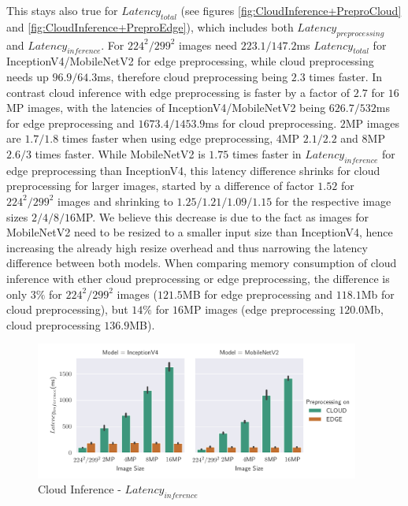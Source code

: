 This stays also true for $Latency_{total}$ (see figures \ref{fig:CloudInference+PreproCloud} and \ref{fig:CloudInference+PreproEdge}), which includes both $Latency_{preprocessing}$ and $Latency_{inference}$. 
For $224^2/299^2$ images need $223.1/147.2$ms $Latency_{total}$ for InceptionV4/MobileNetV2 for edge preprocessing, while cloud preprocessing needs up $96.9/64.3$ms, therefore cloud preprocessing being $2.3$ times faster.
In contrast cloud inference with edge preprocessing is faster by a factor of $2.7$ for $16$MP images, with the latencies of InceptionV4/MobileNetV2 being $626.7/532$ms for edge preprocessing and $1673.4/1453.9$ms for cloud preprocessing. $2$MP images are $1.7/1.8$ times faster when using edge preprocessing, $4$MP $2.1/2.2$ and $8$MP $2.6/3$ times faster.
While MobileNetV2 is $1.75$ times faster in $Latency_{inference}$ for edge preprocessing than InceptionV4, this latency difference shrinks for cloud preprocessing for larger images, started by a difference of factor $1.52$ for $224^2/299^2$ images and shrinking to $1.25/1.21/1.09/1.15$ for the respective image sizes $2/4/8/16$MP.
We believe this decrease is due to the fact as images for MobileNetV2 need to be resized to a smaller input size than InceptionV4, hence increasing the already high resize overhead and thus narrowing the latency difference between both models.
When comparing memory consumption of cloud inference with ether cloud preprocessing or edge preprocessing, the difference is only $3\%$ for  $224^2/299^2$ images ($121.5$MB for edge preprocessing and $118.1$Mb for cloud preprocessing), but $14\%$ for $16$MP images (edge preprocessing $120.0$Mb, cloud preprocessing $136.9$MB).

\begin{figure}[!htb]
\centering
\includegraphics[width=0.95\textwidth]{./Bilder/single_plots/cloud_inference_plots/Cloud_Inference_Latency.pdf}
\caption{Cloud Inference -  $Latency_{inference}$}
\label{fig:cloudInferenceInferenceLatency}
\end{figure}



